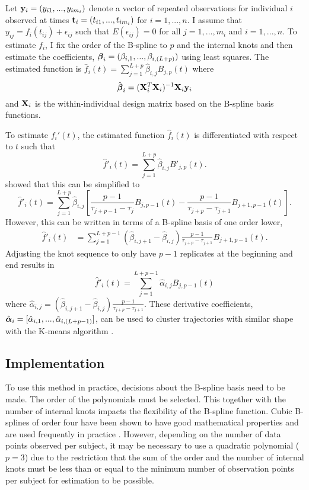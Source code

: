 Let $\mathbf y_{i}=(y_{i1},...,y_{im_{i}})$ denote a vector of repeated observations for individual $i$ observed at times $\mathbf t_{i}=(t_{i1},...,t_{im_{i}})$  for $i=1,...,n$. I assume that $y_{ij} = f_{i}(t_{ij}) + \epsilon_{ij}$ such that $E(\epsilon_{ij}) = 0$ for all $j=1,...,m_{i}$ and $i=1,...,n$.  To estimate $f_{i}$, I fix the order of the B-spline to $p$ and the internal knots and then estimate the coefficients, $\boldsymbol \beta_{i} = (\beta_{i,1},...,\beta_{i, (L+p)})$ using least squares. The estimated function is $\hat{f}_i(t)=\sum^{L+p}_{j=1} \hat{\beta}_{i,j} B_{j,p}(t)$ where
$$\hat{\boldsymbol \beta}_{i} = (\mathbf X_{i}^{T}\mathbf X_{i})^{-1}\mathbf X_{i}\mathbf y_{i}$$
and $\mathbf X_{i}$ is the within-individual design matrix based on the B-spline basis functions. 

To estimate $f_i'(t)$, the estimated function $\hat{f}_i(t)$ is differentiated with respect to $t$ such that
$$\hat{f}'_i(t)=\sum^{L+p}_{j=1} \hat{\beta}_{i,j} B'_{j,p}(t).$$
\Textcite{prochazkova2005} showed that this can be simplified to
$$\hat{f}'_i(t)=\sum^{L+p}_{j=1} \hat{\beta}_{i,j} \left[\frac{p-1}{\tau_{j+p-1}-\tau_j} B_{j,p-1}(t)-\frac{p-1}{\tau_{j+p}-\tau_{j+1}} B_{j+1,p-1}(t)\right].$$
However, this can be written in terms of a B-spline basis of one order lower,
\begin{align*}
\hat{f}'_i(t)&=\sum^{L+p-1}_{j=1} (\hat{\beta}_{i,j+1} -\hat{\beta}_{i,j})\frac{p-1}{\tau_{j+p}-\tau_{j+1} }B_{j+1,p-1}(t).
\end{align*}
Adjusting the knot sequence to only have $p-1$ replicates at the beginning and end results in
$$\hat{f}'_i(t)=\sum^{L+p-1}_{j=1}\hat{\alpha}_{i,j}B_{j,p-1}(t)$$
where $\hat{\alpha}_{i,j}= (\hat{\beta}_{i,j+1} -\hat{\beta}_{i,j})\frac{p-1}{\tau_{j+p}-\tau_{j+1} }$.
These derivative coefficients, $\hat{\boldsymbol \alpha}_{i} = [\hat{\alpha}_{i,1},...,\hat{\alpha}_{i,(L+p-1)}]$, can be used to cluster trajectories with similar shape with the K-means algorithm \cite{macqueen1967, hartigan1979}. 

\subsection{Implementation}
To use this method in practice, decisions about the B-spline basis need to be made. The order of the polynomials must be selected. This together with the number of internal knots impacts the flexibility of the B-spline function. Cubic B-splines of order four have been shown to have good mathematical properties and are used frequently in practice \cite{james2003}. However, depending on the number of data points observed per subject, it may be necessary to use a quadratic polynomial ($p = 3$) due to the restriction that the sum of the order and the number of internal knots must be less than or equal to the minimum number of observation points per subject for estimation to be possible. 

